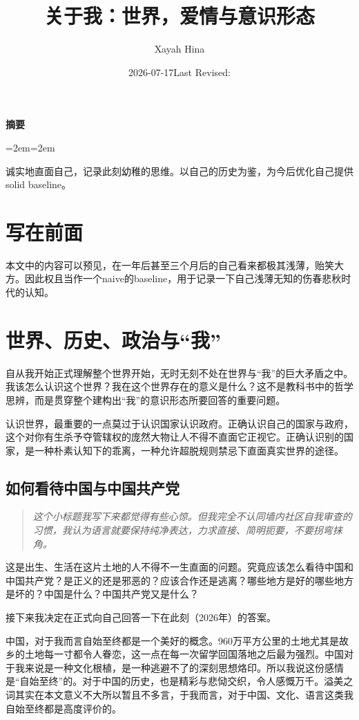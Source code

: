 \documentclass[11pt,twoside,fontset=none,scheme=plain]{ctexart}
\title{关于我：世界，爱情与意识形态}
\author{Xayah Hina}
\date{2026-07-17\quad\textperiodcentered\quad Last Revised: \writinglastrevised}
\makeatletter
\renewcommand{\abstractname}{摘要}
\renewenvironment{abstract}{%
  \begin{center}
    \small\sffamily\bfseries\color{bookink}\abstractname
  \end{center}
  \begin{list}{}{\leftmargin=2em\rightmargin=2em}
    \item\relax\small\color{mutedink}\noindent\ignorespaces
}{%
  \end{list}
  \vspace{1.2em}
}
\renewcommand{\maketitle}{%
  \thispagestyle{plain}%
  \begin{center}
    \vspace*{0.6em}
    {\LARGE\sffamily\bfseries\color{bookink}\@title\par}
    \vspace{1em}
    {\small\color{mutedink}\@author\quad\textperiodcentered\quad\@date\par}
  \end{center}
  \vspace{1.8em}
}
\makeatother
\begin{document}
\maketitle

\begin{abstract}
诚实地直面自己，记录此刻幼稚的思维。以自己的历史为鉴，为今后优化自己提供solid baseline。
\end{abstract}

\section{写在前面}
本文中的内容可以预见，在一年后甚至三个月后的自己看来都极其浅薄，贻笑大方。因此权且当作一个naive的baseline，用于记录一下自己浅薄无知的伤春悲秋时代的认知。


\section{世界、历史、政治与“我”}
自从我开始正式理解整个世界开始，无时无刻不处在世界与“我”的巨大矛盾之中。我该怎么认识这个世界？我在这个世界存在的意义是什么？这不是教科书中的哲学思辨，而是贯穿整个建构出“我”的意识形态所要回答的重要问题。

认识世界，最重要的一点莫过于认识国家认识政府。正确认识自己的国家与政府，这个对你有生杀予夺管辖权的庞然大物让人不得不直面它正视它。正确认识别的国家，是一种朴素认知下的乖离，一种允许超脱规则禁忌下直面真实世界的途径。

\subsection{如何看待中国与中国共产党}
\begin{quote}
\textit{这个小标题我写下来都觉得有些心惊。但我完全不认同墙内社区自我审查的习惯，我认为语言就要保持纯净表达，力求直接、简明扼要，不要拐弯抹角。}
\end{quote}

这是出生、生活在这片土地的人不得不一生直面的问题。究竟应该怎么看待中国和中国共产党？是正义的还是邪恶的？应该合作还是逃离？哪些地方是好的哪些地方是坏的？中国是什么？中国共产党又是什么？

接下来我决定在正式向自己回答一下在此刻（2026年）的答案。

中国，对于我而言自始至终都是一个美好的概念。960万平方公里的土地尤其是故乡的土地每一寸都令人眷恋，这一点在每一次留学回国落地之后最为强烈。中国对于我来说是一种文化根植，是一种逃避不了的深刻思想烙印。所以我说这份感情是“自始至终”的。对于中国的历史，也是精彩与悲恸交织，令人感慨万千。溢美之词其实在本文意义不大所以暂且不多言，于我而言，对于中国、文化、语言这类我自始至终都是高度评价的。
\end{document}

